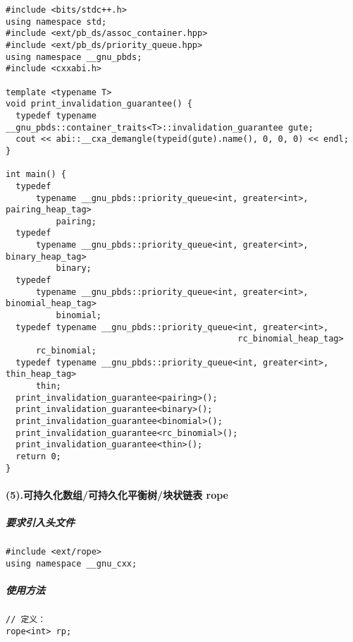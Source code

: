 \documentclass[]{article}
\let\oldparagraph\paragraph
\renewcommand{\paragraph}[1]{\oldparagraph{#1}\mbox{}}
\let\oldsubparagraph\subparagraph
\renewcommand{\subparagraph}[1]{\oldsubparagraph{#1}\mbox{}}
\begin{document}
\begin{verbatim}
#include <bits/stdc++.h>
using namespace std;
#include <ext/pb_ds/assoc_container.hpp>
#include <ext/pb_ds/priority_queue.hpp>
using namespace __gnu_pbds;
#include <cxxabi.h>

template <typename T>
void print_invalidation_guarantee() {
  typedef typename __gnu_pbds::container_traits<T>::invalidation_guarantee gute;
  cout << abi::__cxa_demangle(typeid(gute).name(), 0, 0, 0) << endl;
}

int main() {
  typedef
      typename __gnu_pbds::priority_queue<int, greater<int>, pairing_heap_tag>
          pairing;
  typedef
      typename __gnu_pbds::priority_queue<int, greater<int>, binary_heap_tag>
          binary;
  typedef
      typename __gnu_pbds::priority_queue<int, greater<int>, binomial_heap_tag>
          binomial;
  typedef typename __gnu_pbds::priority_queue<int, greater<int>,
                                              rc_binomial_heap_tag>
      rc_binomial;
  typedef typename __gnu_pbds::priority_queue<int, greater<int>, thin_heap_tag>
      thin;
  print_invalidation_guarantee<pairing>();
  print_invalidation_guarantee<binary>();
  print_invalidation_guarantee<binomial>();
  print_invalidation_guarantee<rc_binomial>();
  print_invalidation_guarantee<thin>();
  return 0;
}
\end{verbatim}

\hypertarget{ux53efux6301ux4e45ux5316ux6570ux7ec4ux53efux6301ux4e45ux5316ux5e73ux8861ux6811ux5757ux72b6ux94feux8868-rope}{%
\paragraph{(5).可持久化数组/可持久化平衡树/块状链表
rope}\label{ux53efux6301ux4e45ux5316ux6570ux7ec4ux53efux6301ux4e45ux5316ux5e73ux8861ux6811ux5757ux72b6ux94feux8868-rope}}

\hypertarget{ux8981ux6c42ux5f15ux5165ux5934ux6587ux4ef6-3}{%
\subparagraph{要求引入头文件}\label{ux8981ux6c42ux5f15ux5165ux5934ux6587ux4ef6-3}}

\begin{verbatim}
#include <ext/rope>
using namespace __gnu_cxx;
\end{verbatim}

\hypertarget{ux4f7fux7528ux65b9ux6cd5-1}{%
\subparagraph{使用方法}\label{ux4f7fux7528ux65b9ux6cd5-1}}

\begin{verbatim}
// 定义：
rope<int> rp;
\end{verbatim}
\end{document}
